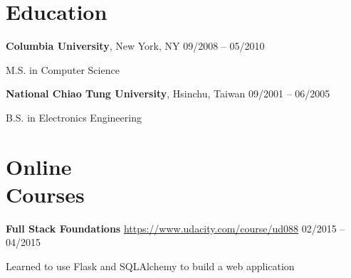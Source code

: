\documentclass[margin,line]{resume}
\begin{document}
\begin{resume}
    \section{\myheadingstyle Education}

    \textbf{Columbia University}, New York, NY \hfill 09/2008 -- 05/2010 \vspace{-3mm}\\\vspace{-1mm}%
      \begin{list2}
       \item M.S. in Computer Science
      \end{list2}
    \vspace{-1mm}
 
    \textbf{National Chiao Tung University}, Hsinchu, Taiwan \hfill 09/2001 -- 06/2005 \vspace{-3mm}\\\vspace{-1mm}%
      \begin{list2}
       \item B.S. in Electronics Engineering
      \end{list2}
    \vspace{-1mm}

    \section{\myheadingstyle Online \\ Courses}

    \textbf{Full Stack Foundations} \url{https://www.udacity.com/course/ud088} \hfill 02/2015 -- 04/2015 \vspace{-3mm}\\\vspace{-1mm}%
      \begin{list2}
       \item Learned to use Flask and SQLAlchemy to build a web application
      \end{list2}
    \vspace{-2mm}


\end{resume}
\end{document}
